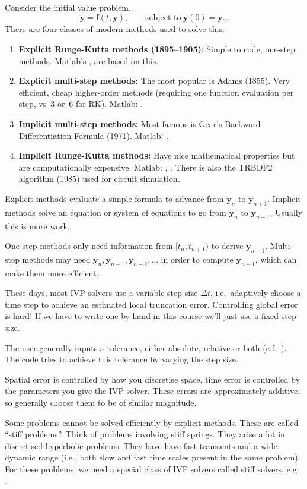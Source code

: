 \documentclass[12pt, a4paper]{article}
\renewcommand{\vec}[1]{\mathbf{#1}}
\theoremstyle{definition}
\theoremstyle{remark}
\numberwithin{equation}{section}
\begin{document}
Consider the initial value problem,
$$ \mathbf{\dot y} = \mathbf{f}(t,\mathbf{y}), \qquad \text{subject to}\ \mathbf{y}(0) = \mathbf{y}_0. $$
There are four classes of modern methods used to solve this:
\begin{enumerate}
\item \textbf{Explicit Runge-Kutta methods (1895--1905)}: Simple to code, one-step
methods. Matlab's ,  are based on this.
\item \textbf{Explicit multi-step methods:} The most popular is Adams (1855).
Very efficient, cheap higher-order methods (requiring one function evaluation
per step, vs~3 or~6 for RK). Matlab: .
\item \textbf{Implicit multi-step methods:} Most famous is Gear's Backward
Differentiation Formula (1971). Matlab: .
\item \textbf{Implicit Runge-Kutta methods:} Have nice mathematical properties
but are computationally expensive. Matlab: , . There
is also the TRBDF2 algorithm (1985) used for circuit simulation.
\end{enumerate}
Explicit methods evaluate a simple formula to advance from $\vec{y}_n$ to $\vec{y}_{n+1}$.
Implicit methods solve an equation or system of equations to go from $\vec{y}_n$
to $\vec{y}_{n+1}$. Usually this is more work.

One-step methods only need information from $[t_n, t_{n+1})$ to derive $\vec{y}_{n+1}$.
Multi-step methods may need $\vec{y}_n, \vec{y}_{n-1}, \vec{y}_{n-2}, \ldots$ in order to compute
$\vec{y}_{n+1}$, which can make them more efficient.

These days, most IVP solvers use a variable step size $\Delta t$, i.e.~adaptively
choose a time step to achieve an estimated local truncation error. Controlling
global error is hard! If we have
to write one by hand in this course we'll just use a fixed step size.

The user generally inputs a tolerance, either absolute, relative or both (c.f.~).
The code tries to achieve this tolerance by varying the step size. 

Spatial error
is controlled by how you discretise space, time error is controlled by the parameters
you give the IVP solver. These errors are approximately additive, so generally
choose them to be of similar magnitude.

Some problems cannot be solved efficiently by explicit methods. These are
called ``stiff problems''. Think of problems involving stiff springs. They
arise a lot in discretised hyperbolic problems. They
have have fast transients and a wide dynamic range (i.e., both slow and fast
time scales present in the same problem). For these problems, we need a special
class of IVP solvers called stiff solvers, e.g. .
\end{document}
